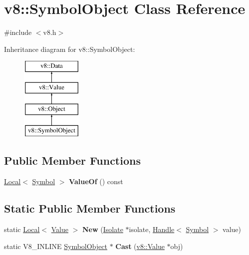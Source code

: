 \hypertarget{classv8_1_1SymbolObject}{\section{v8\-:\-:Symbol\-Object Class Reference}
\label{classv8_1_1SymbolObject}
}


{\ttfamily \#include $<$v8.\-h$>$}

Inheritance diagram for v8\-:\-:Symbol\-Object\-:\begin{figure}[H]
\begin{center}
\leavevmode
\includegraphics[height=4.000000cm]{classv8_1_1SymbolObject}
\end{center}
\end{figure}
\subsection*{Public Member Functions}
\begin{DoxyCompactItemize}
\item 
\hypertarget{classv8_1_1SymbolObject_a4a3b439c6784a4a8d9bdc5a246e12b85}{\hyperlink{classv8_1_1Local}{Local}$<$ \hyperlink{classv8_1_1Symbol}{Symbol} $>$ {\bfseries Value\-Of} () const }\label{classv8_1_1SymbolObject_a4a3b439c6784a4a8d9bdc5a246e12b85}

\end{DoxyCompactItemize}
\subsection*{Static Public Member Functions}
\begin{DoxyCompactItemize}
\item 
\hypertarget{classv8_1_1SymbolObject_a74dfdb8fdd78b14f860e3b20dc7bdc9d}{static \hyperlink{classv8_1_1Local}{Local}$<$ \hyperlink{classv8_1_1Value}{Value} $>$ {\bfseries New} (\hyperlink{classv8_1_1Isolate}{Isolate} $\ast$isolate, \hyperlink{classv8_1_1Handle}{Handle}$<$ \hyperlink{classv8_1_1Symbol}{Symbol} $>$ value)}\label{classv8_1_1SymbolObject_a74dfdb8fdd78b14f860e3b20dc7bdc9d}

\item 
\hypertarget{classv8_1_1SymbolObject_aa98d7c4211bd55e347ee8169143fcec9}{static V8\-\_\-\-I\-N\-L\-I\-N\-E \hyperlink{classv8_1_1SymbolObject}{Symbol\-Object} $\ast$ {\bfseries Cast} (\hyperlink{classv8_1_1Value}{v8\-::\-Value} $\ast$obj)}\label{classv8_1_1SymbolObject_aa98d7c4211bd55e347ee8169143fcec9}

\end{DoxyCompactItemize}


